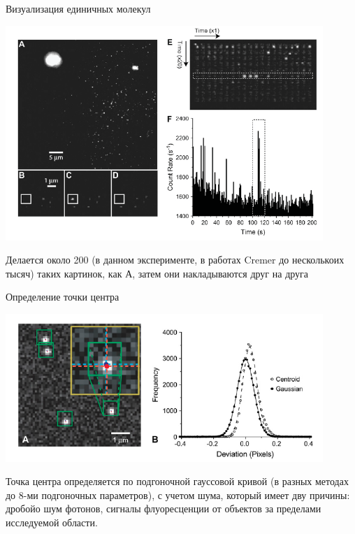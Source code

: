 \documentclass[9pt, compress, xcolor=table]{beamer}
\begin{document}
\begin{frame}{Визуализация единичных молекул}
\begin{center}
\includegraphics[width=0.9\textwidth]{lm5}

Делается около 200 (в данном эксперименте, в работах Cremer до несколькоих тысяч) таких картинок, как А, затем они накладываются друг на друга

\end{center}
\end{frame}

\begin{frame}{Определение точки центра}
\begin{center}
\includegraphics[width=0.9\textwidth]{lm3}

Точка центра определяется по подгоночной гауссовой кривой (в разных методах до 8-ми подгоночных параметров), с учетом шума, который имеет дву причины: дробойо шум фотонов, сигналы флуоресценции от объектов за пределами исследуемой области.

\end{center}
\end{frame}
\end{document}
